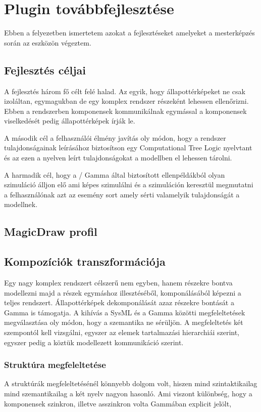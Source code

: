 \chapter{Plugin továbbfejlesztése}

Ebben a felyezetben ismertetem azokat a fejlesztéseket amelyeket a mesterképzés során az eszközön végeztem.

\section{Fejlesztés céljai}

A fejlesztés három fő célt felé halad. Az egyik, hogy állapottérképeket ne csak izoláltan, egymagukban de egy komplex rendszer részeként lehessen ellenőrizni. Ebben a rendszerben komponensek kommunikálnak egymással a komponensek viselkedését pedig állapottérképek írják le.

A második cél a felhasználói élmény javítás oly módon, hogy a rendszer tulajdonságainak leírásához biztosítson egy Computational Tree Logic nyelvtant és az ezen a nyelven leírt tulajdonságokat a modellben el lehessen tárolni.

A harmadik cél, hogy a \uppaal / Gamma által biztosított ellenpéldákból olyan szimuláció álljon elő ami képes szimulálni és a szimuláción keresztül megmutatni a felhasználónak azt az esemény sort amely sérti valamelyik tulajdonságát a modellnek.

\section{MagicDraw profil}

\section{Kompozíciók transzformációja}

Egy nagy komplex rendszert célszerű nem egyben, hanem részekre bontva modellezni majd a részek egymáshoz illesztéséből, komponálásából képezni a teljes rendszert. Állapottérképek dekomponálását azaz részekre bontását a Gamma is támogatja. A kihívás a SysML és a Gamma közötti megfeleltetések megválasztása oly módon, hogy a szemantika ne sérüljön. A megfeleltetés két szempontól kell vizsgálni, egyszer az elemek tartalmazási hierarchiái szerint, egyszer pedig a köztük modellezett kommunikáció szerint.

\subsection{Struktúra megfeleltetése}
A struktúrák megfeleltetésénél könnyebb dolgom volt, hiszen mind szintaktikailag mind szemantikailag a két nyelv nagyon hasonló. Ami viszont különbség, hogy a komponensek szinkron, illetve asszinkron volta Gammában explicit jelölt, %

